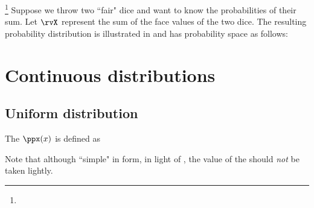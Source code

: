 \begin{example}
\footnote{
  }
\label{ex:two_dice}
Suppose we throw two ``fair" dice and want to know the probabilities of their sum.
Let $\rvX$ represent the sum  of the face values of the two dice.
The resulting probability distribution is illustrated in 
and has probability space as follows:


\end{example}

\section{Continuous distributions}
\subsection{Uniform distribution}
\begin{definition}
\label{def:uniform}
The  $\ppx(x)$ is defined as
\end{definition}

Note that although ``simple" in form, in light of ,{\footnotemark} the
value of the  should \emph{not} be taken lightly.

